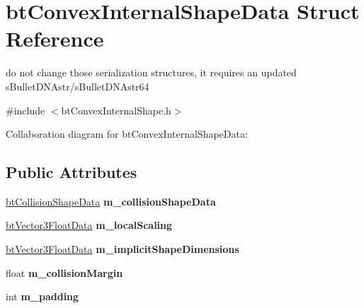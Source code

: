 \hypertarget{structbt_convex_internal_shape_data}{\section{bt\+Convex\+Internal\+Shape\+Data Struct Reference}
\label{structbt_convex_internal_shape_data}
}


do not change those serialization structures, it requires an updated s\+Bullet\+D\+N\+Astr/s\+Bullet\+D\+N\+Astr64  




{\ttfamily \#include $<$bt\+Convex\+Internal\+Shape.\+h$>$}



Collaboration diagram for bt\+Convex\+Internal\+Shape\+Data\+:
\subsection*{Public Attributes}
\begin{DoxyCompactItemize}
\item 
\hypertarget{structbt_convex_internal_shape_data_ae3d01d09252583c2eafaff69fc3b9b8a}{\hyperlink{structbt_collision_shape_data}{bt\+Collision\+Shape\+Data} {\bfseries m\+\_\+collision\+Shape\+Data}}\label{structbt_convex_internal_shape_data_ae3d01d09252583c2eafaff69fc3b9b8a}

\item 
\hypertarget{structbt_convex_internal_shape_data_aa796d833f0645854758e66f49ba85f8e}{\hyperlink{structbt_vector3_float_data}{bt\+Vector3\+Float\+Data} {\bfseries m\+\_\+local\+Scaling}}\label{structbt_convex_internal_shape_data_aa796d833f0645854758e66f49ba85f8e}

\item 
\hypertarget{structbt_convex_internal_shape_data_a4345edbcc0c3a1c43ac9ef5aaba2a4f9}{\hyperlink{structbt_vector3_float_data}{bt\+Vector3\+Float\+Data} {\bfseries m\+\_\+implicit\+Shape\+Dimensions}}\label{structbt_convex_internal_shape_data_a4345edbcc0c3a1c43ac9ef5aaba2a4f9}

\item 
\hypertarget{structbt_convex_internal_shape_data_a56149d2d6b4bd8312309255dfa313981}{float {\bfseries m\+\_\+collision\+Margin}}\label{structbt_convex_internal_shape_data_a56149d2d6b4bd8312309255dfa313981}

\item 
\hypertarget{structbt_convex_internal_shape_data_adceba766bdf7c238289cbada9bd17193}{int {\bfseries m\+\_\+padding}}\label{structbt_convex_internal_shape_data_adceba766bdf7c238289cbada9bd17193}

\end{DoxyCompactItemize}


